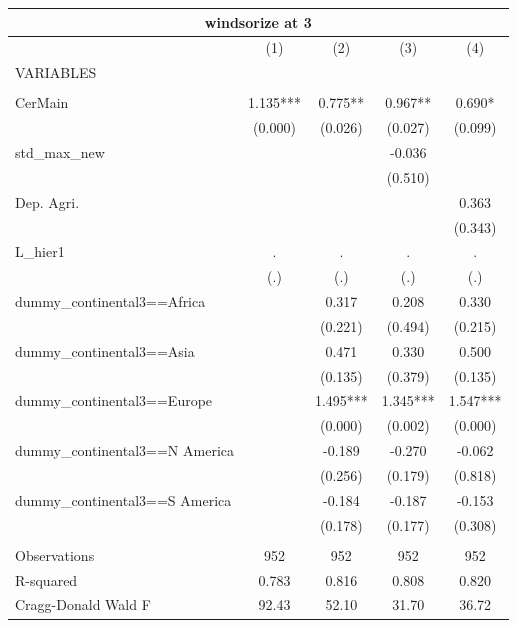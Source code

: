 \documentclass[12pt,a4paper]{article}
\begin{document}
\begin{tabular}{lcccc}
\multicolumn{5}{c}{windsorize at 3} \\ \hline
 & (1) & (2) & (3) & (4) \\
VARIABLES &  &  &  &  \\ \hline
 &  &  &  &  \\
CerMain & 1.135*** & 0.775** & 0.967** & 0.690* \\
 & (0.000) & (0.026) & (0.027) & (0.099) \\
std\_max\_new &  &  & -0.036 &  \\
 &  &  & (0.510) &  \\
Dep. Agri. &  &  &  & 0.363 \\
 &  &  &  & (0.343) \\
L\_hier1 & . & . & . & . \\
 & (.) & (.) & (.) & (.) \\
dummy\_continental3==Africa &  & 0.317 & 0.208 & 0.330 \\
 &  & (0.221) & (0.494) & (0.215) \\
dummy\_continental3==Asia &  & 0.471 & 0.330 & 0.500 \\
 &  & (0.135) & (0.379) & (0.135) \\
dummy\_continental3==Europe &  & 1.495*** & 1.345*** & 1.547*** \\
 &  & (0.000) & (0.002) & (0.000) \\
dummy\_continental3==N America &  & -0.189 & -0.270 & -0.062 \\
 &  & (0.256) & (0.179) & (0.818) \\
dummy\_continental3==S America &  & -0.184 & -0.187 & -0.153 \\
 &  & (0.178) & (0.177) & (0.308) \\
 &  &  &  &  \\
Observations & 952 & 952 & 952 & 952 \\
R-squared & 0.783 & 0.816 & 0.808 & 0.820 \\
 Cragg-Donald Wald F & 92.43 & 52.10 & 31.70 & 36.72 \\ \hline
\end{tabular}
\end{document}

